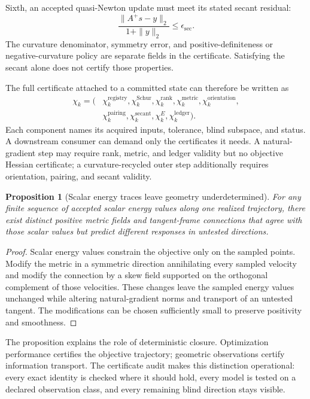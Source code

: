 \documentclass[10pt,twocolumn]{article}
\newtheorem{proposition}[theorem]{Proposition}
\theoremstyle{definition}
\theoremstyle{remark}
\begin{document}
Sixth, an accepted quasi-Newton update must meet its stated secant residual:
\begin{equation}
 \frac{\|A^+s-y\|_2}{1+\|y\|_2}\le\epsilon_{\mathrm{sec}} .
 \label{eq:appsecantaudit}
\end{equation}
The curvature denominator, symmetry error, and positive-definiteness or
negative-curvature policy are separate fields in the certificate.  Satisfying
the secant alone does not certify those properties.

The full certificate attached to a committed state can therefore be written
as
\begin{align}
 \chi_k=\big(&\chi_k^{\mathrm{registry}},
 \chi_k^{\mathrm{Schur}},
 \chi_k^{\mathrm{rank}},
 \chi_k^{\mathrm{metric}},
 \chi_k^{\mathrm{orientation}},\nonumber\\
 &\chi_k^{\mathrm{pairing}},
 \chi_k^{\mathrm{secant}},
 \chi_k^{E},
 \chi_k^{\mathrm{ledger}}\big).
 \label{eq:appcertificate}
\end{align}
Each component names its acquired inputs, tolerance, blind subspace, and
status.  A downstream consumer can demand only the certificates it needs.  A
natural-gradient step may require rank, metric, and ledger validity but no
objective Hessian certificate; a curvature-recycled outer step additionally
requires orientation, pairing, and secant validity.

\begin{proposition}[Scalar energy traces leave geometry underdetermined]
\label{prop:energynotgeometry}
For any finite sequence of accepted scalar energy values along one realized
trajectory, there exist distinct positive metric fields and tangent-frame
connections that agree with those scalar values but predict different
responses in untested directions.
\end{proposition}
\begin{proof}
Scalar energy values constrain the objective only on the sampled points.
Modify the metric in a symmetric direction annihilating every sampled
velocity and modify the connection by a skew field supported on the
orthogonal complement of those velocities.  These changes leave the sampled
energy values unchanged while altering natural-gradient norms and transport
of an untested tangent.  The modifications can be chosen sufficiently small
to preserve positivity and smoothness.
\end{proof}

The proposition explains the role of deterministic closure.  Optimization
performance certifies the objective trajectory; geometric observations certify
information transport.  The certificate audit makes this distinction operational: every
exact identity is checked where it should hold, every model is tested on a
declared observation class, and every remaining blind direction stays
visible.
\end{document}
